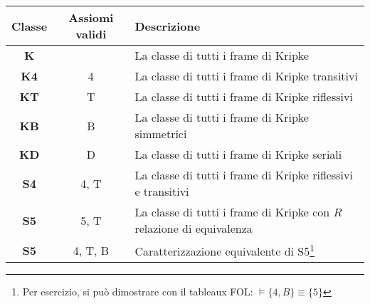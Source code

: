 \bgroup
\def\arraystretch{1.5}
\begin{tabularx}{\textwidth}{|c c X|}
\hline
Classe & Assiomi validi & Descrizione\\
\hline
\textbf{K} & &La classe di tutti i frame di Kripke\\
\textbf{K4} & 4 &La classe di tutti i frame di Kripke transitivi\\
\textbf{KT} & T &La classe di tutti i frame di Kripke riflessivi\\
\textbf{KB} & B &La classe di tutti i frame di Kripke simmetrici\\
\textbf{KD} & D &La classe di tutti i frame di Kripke seriali\\
\textbf{S4} & 4, T &La classe di tutti i frame di Kripke riflessivi e transitivi\\
\textbf{S5} & 5, T &La classe di tutti i frame di Kripke con $R$ relazione di equivalenza\\
\textbf{S5} & 4, T, B &Caratterizzazione equivalente di S5\footnote{Per esercizio, si può dimostrare con il tableaux FOL: $\models \lbrace 4, B \rbrace \equiv \lbrace 5 \rbrace$} \\
\hline
\end{tabularx}
\egroup
